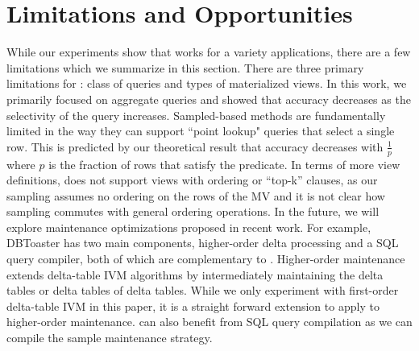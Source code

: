 \section{Limitations and Opportunities}\vspace{-.3em}\label{sec:disc}
While our experiments show that \svc works for a variety applications, there are a few limitations which we summarize in this section.
There are three primary limitations for \svc: class of queries and types of materialized views.
In this work, we primarily focused on aggregate queries and showed that accuracy decreases as the selectivity of the query increases.
Sampled-based methods are fundamentally limited in the way they can support ``point lookup" queries that select a single row.
This is predicted by our theoretical result that accuracy decreases with $\frac{1}{p}$ where $p$ is the fraction of rows that satisfy the predicate.
In terms of more view definitions, \svc does not support views with ordering or ``top-k'' clauses, as our sampling assumes no ordering on the rows of the MV and it is not clear how sampling commutes with general ordering operations.
In the future, we will explore maintenance optimizations proposed in recent work.
For example, DBToaster has two main components, higher-order delta processing and a SQL query compiler, both of which are complementary to \svc.
Higher-order maintenance extends delta-table IVM algorithms by intermediately maintaining the delta tables or delta tables of delta tables.
While we only experiment with first-order delta-table IVM in this paper, it is a straight forward extension to apply \svc to higher-order maintenance.
\svc can also benefit from SQL query compilation as we can compile the sample maintenance strategy.


